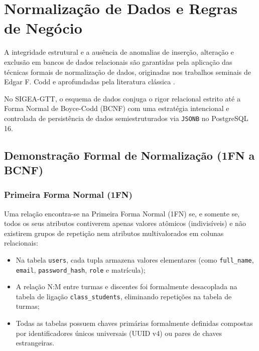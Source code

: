 \chapter{Normalização de Dados e Regras de Negócio}
\label{cap_normalizacao_regras}

A integridade estrutural e a ausência de anomalias de inserção, alteração e exclusão em bancos de dados relacionais são garantidas pela aplicação das técnicas formais de normalização de dados, originadas nos trabalhos seminais de Edgar F. Codd \cite{codd1970, codd1972} e aprofundadas pela literatura clássica \cite{date2019, elmasri2016}.

No SIGEA-GTT, o esquema de dados conjuga o rigor relacional estrito até a Forma Normal de Boyce-Codd (BCNF) com uma estratégia intencional e controlada de persistência de dados semiestruturados via \texttt{JSONB} no PostgreSQL 16.

\section{Demonstração Formal de Normalização (1FN a BCNF)}
\label{sec_formas_normais}

\subsection{Primeira Forma Normal (1FN)}
Uma relação encontra-se na Primeira Forma Normal (1FN) se, e somente se, todos os seus atributos contiverem apenas valores atômicos (indivisíveis) e não existirem grupos de repetição nem atributos multivalorados em colunas relacionais:
\begin{itemize}
    \item Na tabela \texttt{users}, cada tupla armazena valores elementares (como \texttt{full\_name}, \texttt{email}, \texttt{password\_hash}, \texttt{role} e matrícula);
    \item A relação N:M entre turmas e discentes foi formalmente desacoplada na tabela de ligação \texttt{class\_students}, eliminando repetições na tabela de turmas;
    \item Todas as tabelas possuem chaves primárias formalmente definidas compostas por identificadores únicos universais (UUID v4) ou pares de chaves estrangeiras.
\end{itemize}

